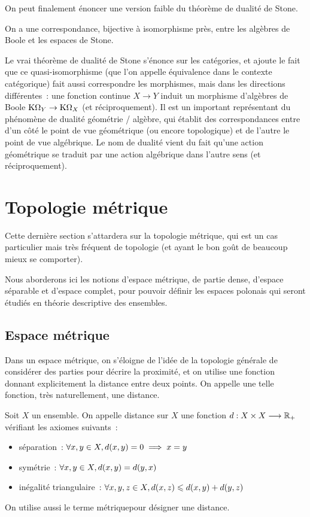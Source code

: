 \noindent
On peut finalement énoncer une version faible du théorème de dualité de Stone.

\begin{theorem}
  On a une correspondance, bijective à isomorphisme près, entre les algèbres
  de Boole et les espaces de Stone.
\end{theorem}

Le vrai théorème de dualité de Stone s'énonce sur les catégories, et ajoute le
fait que ce quasi-isomorphisme (que l'on appelle équivalence dans le contexte
catégorique) fait aussi correspondre les morphismes, mais dans les directions
différentes~: une fonction continue $X \to Y$ induit un morphisme d'algèbres de
Boole $\mathrm{K}\Omega_{Y}\to\mathrm{K}\Omega_{X}$ (et réciproquement). Il est un
important représentant du phénomène de dualité géométrie / algèbre, qui établit
des correspondances entre d'un côté le point de vue géométrique (ou encore
topologique) et de l'autre le point de vue algébrique. Le nom de dualité vient
du fait qu'une action géométrique se traduit par une action algébrique dans
l'autre sens (et réciproquement).

\section{Topologie métrique}

Cette dernière section s'attardera sur la topologie métrique, qui est un cas
particulier mais très fréquent de topologie (et ayant le bon goût de beaucoup
mieux se comporter).

Nous aborderons ici les notions d'espace métrique, de partie dense, d'espace
séparable et d'espace complet, pour pouvoir définir les espaces polonais qui
seront étudiés en théorie descriptive des ensembles.

\subsection{Espace métrique}

Dans un espace métrique, on s'éloigne de l'idée de la topologie générale de
considérer des parties pour décrire la proximité, et on utilise une fonction
donnant explicitement la distance entre deux points. On appelle une telle
fonction, très naturellement, une distance.

\begin{definition}[Distance]
  Soit $X$ un ensemble. On appelle distance sur $X$ une fonction
  $d : \displaystyle X \times X \longrightarrow \mathbb R_+$ vérifiant les axiomes suivants~:
  \begin{itemize}
  \item séparation~: $\forall x,y\in X, d(x,y) = 0 \implies x = y$
  \item symétrie~: $\forall x,y\in X, d(x,y)=d(y,x)$
  \item inégalité triangulaire~:
    $\forall x,y,z\in X, d(x,z) \leqslant d(x,y)+d(y,z)$
  \end{itemize}

  \noindent
  On utilise aussi le terme \og métrique\fg pour désigner une distance.
\end{definition}

